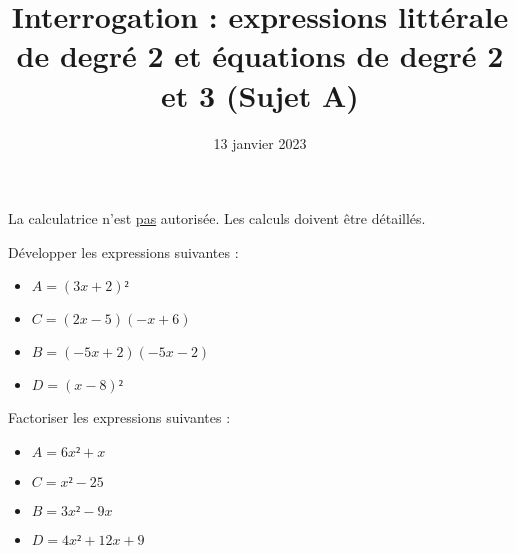 \documentclass[
	classe=$1^{ere}STI2D$,
	headerTitle=Interrogation
]{évaluation}
\title{Interrogation : expressions littérale de degré 2 et équations de degré 2 et 3 (Sujet A)}
\date{13 janvier 2023}
\begin{document}
\newcommand{\spacing}{4em}

\maketitle

\begin{tcolorbox}
	La calculatrice n'est \uline{pas} autorisée. Les calculs doivent être détaillés.
\end{tcolorbox}

\begin{exercice}
	Développer les expressions suivantes :
	\begin{multicols}{2}
		\begin{itemize}
			\item $A = (3x + 2)²$\vspace{\spacing}


			\item $C = (2x - 5)(-x + 6)$\vspace{\spacing}


			\item $B = (-5x + 2)(-5x - 2)$\vspace{\spacing}


			\item $D = (x - 8)²$\vspace{\spacing}


		\end{itemize}
	\end{multicols}
\end{exercice}

\begin{exercice}
	Factoriser les expressions suivantes :
	\begin{multicols}{2}
		\begin{itemize}
			\item $A = 6x² + x$\vspace{\spacing}

			\item $C = x² - 25$\vspace{\spacing}

			\item $B = 3x² - 9x$\vspace{\spacing}

			\item $D = 4x² + 12x + 9$\vspace{\spacing}

		\end{itemize}
	\end{multicols}
\end{exercice}
\end{document}
